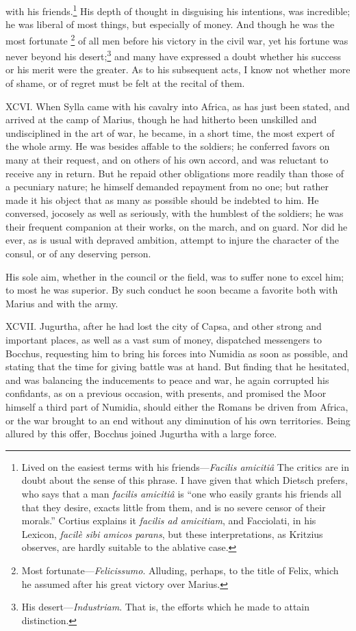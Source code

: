 with his friends.\footnote{Lived on the easiest terms with his friends—\emph{Facilis
amicitiâ} The critics are in doubt about the sense of this phrase. I
have given that which Dietsch prefers, who says that a man \emph{facilis
amicitiâ} is ``one who easily grants his friends all that they desire,
exacts little from them, and is no severe censor of their morals.''
Cortius explains it \emph{facilis ad amicitiam}, and Facciolati, in his
Lexicon, \emph{facilè sibi amicos parans}, but these interpretations, as
Kritzius observes, are hardly suitable to the ablative case.} His depth of thought in disguising his
intentions, was incredible; he was liberal of most things, but
especially of money. And though he was the most fortunate \footnote{Most fortunate—\emph{Felicissumo}. Alluding, perhaps, to the
title of Felix, which he assumed after his great victory over Marius.} of all
men before his victory in the civil war, yet his fortune was never
beyond his desert;\footnote{His desert—\emph{Industriam}. That is, the efforts which he made to
attain distinction.} and many have expressed a doubt whether his
success or his merit were the greater. As to his subsequent acts, I
know not whether more of shame, or of regret must be felt at the
recital of them.

XCVI. When Sylla came with his cavalry into Africa, as has just been
stated, and arrived at the camp of Marius, though he had hitherto been
unskilled and undisciplined in the art of war, he became, in a short
time, the most expert of the whole army. He was besides affable to the
soldiers; he conferred favors on many at their request, and on others
of his own accord, and was reluctant to receive any in return. But he
repaid other obligations more readily than those of a pecuniary
nature; he himself demanded repayment from no one; but rather made it
his object that as many as possible should be indebted to him. He
conversed, jocosely as well as seriously, with the humblest of the
soldiers; he was their frequent companion at their works, on the
march, and on guard. Nor did he ever, as is usual with depraved
ambition, attempt to injure the character of the consul, or of any
deserving person.

His sole aim, whether in the council or the field, was to suffer none
to excel him; to most he was superior. By such conduct he soon became
a favorite both with Marius and with the army.

XCVII. Jugurtha, after he had lost the city of Capsa, and other strong
and important places, as well as a vast sum of money, dispatched
messengers to Bocchus, requesting him to bring his forces into Numidia
as soon as possible, and stating that the time for giving battle was
at hand. But finding that he hesitated, and was balancing the
inducements to peace and war, he again corrupted his confidants, as on
a previous occasion, with presents, and promised the Moor himself a
third part of Numidia, should either the Romans be driven from Africa,
or the war brought to an end without any diminution of his own
territories. Being allured by this offer, Bocchus joined Jugurtha with
a large force.

